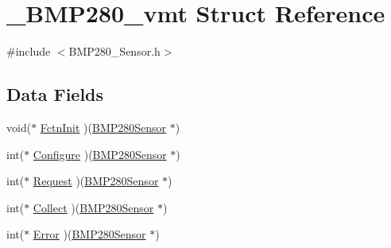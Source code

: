 \hypertarget{struct___b_m_p280__vmt}{\section{\-\_\-\-B\-M\-P280\-\_\-vmt Struct Reference}
\label{struct___b_m_p280__vmt}
}


{\ttfamily \#include $<$B\-M\-P280\-\_\-\-Sensor.\-h$>$}

\subsection*{Data Fields}
\begin{DoxyCompactItemize}
\item 
void($\ast$ \hyperlink{struct___b_m_p280__vmt_a56cb4f192918dab19f6594f332cd8c51}{Fctn\-Init} )(\hyperlink{_b_m_p280___sensor_8h_a60806e7544fdc94d70d1ef5937e17f28}{B\-M\-P280\-Sensor} $\ast$)
\item 
int($\ast$ \hyperlink{struct___b_m_p280__vmt_a02c800133b0696a925cc7cab20cf385f}{Configure} )(\hyperlink{_b_m_p280___sensor_8h_a60806e7544fdc94d70d1ef5937e17f28}{B\-M\-P280\-Sensor} $\ast$)
\item 
int($\ast$ \hyperlink{struct___b_m_p280__vmt_a92b083c30e4c2517137943ce6e787547}{Request} )(\hyperlink{_b_m_p280___sensor_8h_a60806e7544fdc94d70d1ef5937e17f28}{B\-M\-P280\-Sensor} $\ast$)
\item 
int($\ast$ \hyperlink{struct___b_m_p280__vmt_a807519b51b953f4be7be6778a53905dc}{Collect} )(\hyperlink{_b_m_p280___sensor_8h_a60806e7544fdc94d70d1ef5937e17f28}{B\-M\-P280\-Sensor} $\ast$)
\item 
int($\ast$ \hyperlink{struct___b_m_p280__vmt_aa31c53475ba0d8d65d5c3cc56753f6f0}{Error} )(\hyperlink{_b_m_p280___sensor_8h_a60806e7544fdc94d70d1ef5937e17f28}{B\-M\-P280\-Sensor} $\ast$)
\end{DoxyCompactItemize}


